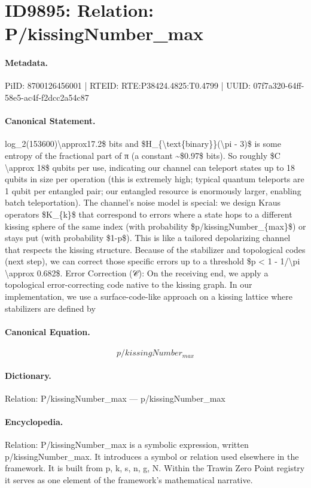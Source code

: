 \section*{ID9895: Relation: P/kissingNumber\_max}
\paragraph{Metadata.}
PiID: 8700126456001 | RTEID: RTE:P38424.4825:T0.4799 | UUID: 07f7a320-64ff-58e5-ac4f-f2dcc2a54c87

\paragraph{Canonical Statement.}
log\_2(153600)\textbackslash{}approx17.2\$ bits and \$H\_\{\textbackslash{}text\{binary\}\}(\textbackslash{}pi - 3)\$ is some entropy of the fractional part of π (a constant \textasciitilde{}\$0.97\$ bits). So roughly \$C \textbackslash{}approx 18\$ qubits per use, indicating our channel can teleport states up to 18 qubits in size per operation (this is extremely high; typical quantum teleports are 1 qubit per entangled pair; our entangled resource is enormously larger, enabling batch teleportation). The channel’s noise model is special: we design Kraus operators \$K\_\{k\}\$ that correspond to errors where a state hops to a different kissing sphere of the same index (with probability \$p/kissingNumber\_\{max\}\$) or stays put (with probability \$1-p\$). This is like a tailored depolarizing channel that respects the kissing structure. Because of the stabilizer and topological codes (next step), we can correct those specific errors up to a threshold \$p < 1 - 1/\textbackslash{}pi \textbackslash{}approx 0.682\$. Error Correction (𝒞): On the receiving end, we apply a topological error-correcting code native to the kissing graph. In our implementation, we use a surface-code-like approach on a kissing lattice where stabilizers are defined by

\paragraph{Canonical Equation.}
\[
p/kissingNumber_{max}
\]

\paragraph{Dictionary.}
Relation: P/kissingNumber\_max — p/kissingNumber\_max

\paragraph{Encyclopedia.}
Relation: P/kissingNumber\_max is a symbolic expression, written p/kissingNumber\_max. It introduces a symbol or relation used elsewhere in the framework. It is built from p, k, s, n, g, N. Within the Trawin Zero Point registry it serves as one element of the framework's mathematical narrative.
